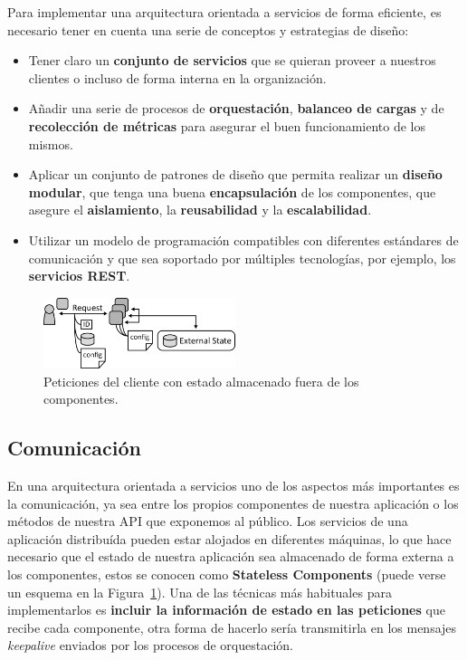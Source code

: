 Para implementar una arquitectura orientada a servicios de forma eficiente, es necesario tener en cuenta una serie de conceptos y estrategias de diseño:
\begin{itemize}
\item Tener claro un \textbf{conjunto de servicios} que se quieran proveer a nuestros clientes o incluso de forma interna en la organización.
\item Añadir una serie de procesos de \textbf{orquestación}, \textbf{balanceo de cargas} y de \textbf{recolección de métricas} para asegurar el buen funcionamiento de los mismos.
\item Aplicar un conjunto de patrones de diseño que permita realizar un \textbf{diseño modular}, que tenga una buena \textbf{encapsulación} de los componentes, que asegure el \textbf{aislamiento}, la \textbf{reusabilidad} y la \textbf{escalabilidad}.
\item Utilizar un modelo de programación compatibles con diferentes estándares de comunicación y que sea soportado por múltiples tecnologías, por ejemplo, los \textbf{servicios REST}.
\end{itemize}

\begin{figure}
\centering
\includegraphics[width=0.5\textwidth]{stateless.png}
\caption{\label{fig:scomm}Peticiones del cliente con estado almacenado fuera de los componentes\cite{sless}.}
\end{figure}

\subsection{Comunicación}
En una arquitectura orientada a servicios uno de los aspectos más importantes es la comunicación, ya sea entre los propios componentes de nuestra aplicación o los métodos de nuestra API que exponemos al público. Los servicios de una aplicación distribuída pueden estar alojados en diferentes máquinas, lo que hace necesario que el estado de nuestra aplicación sea almacenado de forma externa a los componentes, estos se conocen como \textbf{Stateless Components}  (puede verse un esquema en la Figura~\ref{fig:scomm}). Una de las técnicas más habituales para implementarlos es \textbf{incluir la información de estado en las peticiones} que recibe cada componente, otra forma de hacerlo sería transmitirla en los mensajes \emph{keepalive} enviados por los procesos de orquestación.

